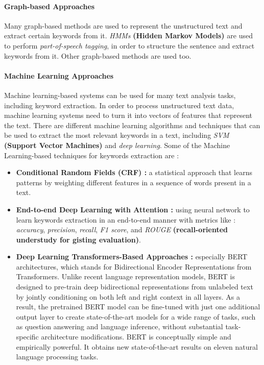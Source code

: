 \paragraph{Graph-based Approaches}
Many graph-based methods are used to represent the unstructured text and extract certain keywords from it. \emph{HMMs} \textbf{(Hidden Markov Models)} are used to perform \emph{part-of-speech tagging}, in order to structure the sentence and extract keywords from it. Other graph-based methods are used too.

\paragraph{Machine Learning Approaches}
Machine learning-based systems can be used for many text analysis tasks, including keyword extraction. In order to process unstructured text data, machine learning systems need to turn it into vectors of features that represent the text. There are different machine learning algorithms and techniques that can be used to extract the most relevant keywords in a text, including \emph{SVM} \textbf{(Support Vector Machines)} and \emph{deep learning}. Some of the Machine Learning-based techniques for keywords extraction are :
\begin{itemize}
    \item \textbf{Conditional Random Fields (CRF) :} a statistical approach that learns patterns by weighting different features in a sequence of words present in a text.
    \item \textbf{End-to-end Deep Learning with Attention :} using neural network to learn keywords extraction in an end-to-end manner with metrics like : \emph{accuracy}, \emph{precision}, \emph{recall}, \emph{F1 score}, and \emph{ROUGE} \textbf{(recall-oriented understudy for gisting evaluation)}.
    
    \item \textbf{Deep Learning Transformers-Based Approaches :} especially BERT architectures, which stands for Bidirectional Encoder Representations from Transformers. Unlike recent language representation models, BERT is designed to pre-train deep bidirectional representations from unlabeled text by jointly conditioning on both left and right context in all layers. As a result, the pretrained BERT model can be fine-tuned with just one additional output layer to create state-of-the-art models for a wide range of tasks, such as question answering and language inference, without substantial task-specific architecture modifications.
    BERT is conceptually simple and empirically powerful. It obtains new state-of-the-art results on eleven natural language processing tasks.
    
\end{itemize}

